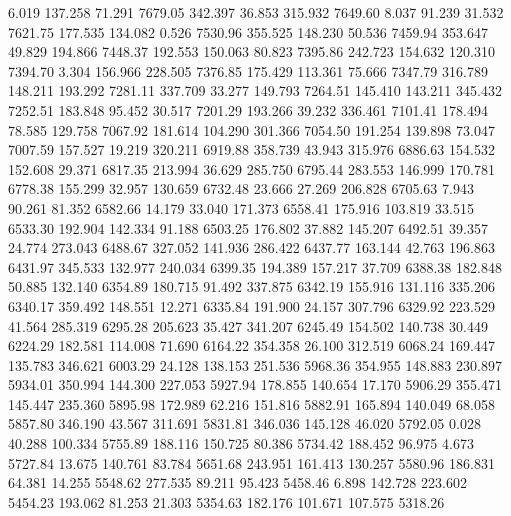    6.019  137.258   71.291      7679.05
 342.397   36.853  315.932      7649.60
   8.037   91.239   31.532      7621.75
 177.535  134.082    0.526      7530.96
 355.525  148.230   50.536      7459.94
 353.647   49.829  194.866      7448.37
 192.553  150.063   80.823      7395.86
 242.723  154.632  120.310      7394.70
   3.304  156.966  228.505      7376.85
 175.429  113.361   75.666      7347.79
 316.789  148.211  193.292      7281.11
 337.709   33.277  149.793      7264.51
 145.410  143.211  345.432      7252.51
 183.848   95.452   30.517      7201.29
 193.266   39.232  336.461      7101.41
 178.494   78.585  129.758      7067.92
 181.614  104.290  301.366      7054.50
 191.254  139.898   73.047      7007.59
 157.527   19.219  320.211      6919.88
 358.739   43.943  315.976      6886.63
 154.532  152.608   29.371      6817.35
 213.994   36.629  285.750      6795.44
 283.553  146.999  170.781      6778.38
 155.299   32.957  130.659      6732.48
  23.666   27.269  206.828      6705.63
   7.943   90.261   81.352      6582.66
  14.179   33.040  171.373      6558.41
 175.916  103.819   33.515      6533.30
 192.904  142.334   91.188      6503.25
 176.802   37.882  145.207      6492.51
  39.357   24.774  273.043      6488.67
 327.052  141.936  286.422      6437.77
 163.144   42.763  196.863      6431.97
 345.533  132.977  240.034      6399.35
 194.389  157.217   37.709      6388.38
 182.848   50.885  132.140      6354.89
 180.715   91.492  337.875      6342.19
 155.916  131.116  335.206      6340.17
 359.492  148.551   12.271      6335.84
 191.900   24.157  307.796      6329.92
 223.529   41.564  285.319      6295.28
 205.623   35.427  341.207      6245.49
 154.502  140.738   30.449      6224.29
 182.581  114.008   71.690      6164.22
 354.358   26.100  312.519      6068.24
 169.447  135.783  346.621      6003.29
  24.128  138.153  251.536      5968.36
 354.955  148.883  230.897      5934.01
 350.994  144.300  227.053      5927.94
 178.855  140.654   17.170      5906.29
 355.471  145.447  235.360      5895.98
 172.989   62.216  151.816      5882.91
 165.894  140.049   68.058      5857.80
 346.190   43.567  311.691      5831.81
 346.036  145.128   46.020      5792.05
   0.028   40.288  100.334      5755.89
 188.116  150.725   80.386      5734.42
 188.452   96.975    4.673      5727.84
  13.675  140.761   83.784      5651.68
 243.951  161.413  130.257      5580.96
 186.831   64.381   14.255      5548.62
 277.535   89.211   95.423      5458.46
   6.898  142.728  223.602      5454.23
 193.062   81.253   21.303      5354.63
 182.176  101.671  107.575      5318.26
